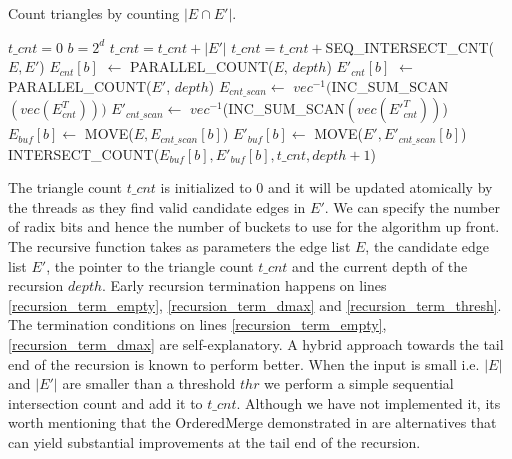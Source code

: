 \documentclass[conference]{IEEEtran}
\begin{document}
\begin{algorithm}
  \caption{Count triangles by counting $|E \cap E'|$.\label{tri_count}}
  \begin{algorithmic}[1]
    \Statex
    \State $t\_cnt = 0$ 
    \State $b=2^d$ 
       \label{recursion_term_empty}
	\State \Return{}
      \EndIf
	\State $t\_cnt = t\_cnt + |E'|$
	\State \Return{}
      \EndIf
	\State $t\_cnt = t\_cnt +$SEQ\_INTERSECT\_CNT($E, E'$)
	\State \Return{}
      \EndIf
      \State $E_{cnt}[b]$ $\gets$ PARALLEL\_COUNT($E$, $depth$) \label{par_cnt_e}
      \State $E'_{cnt}[b]$ $\gets$ PARALLEL\_COUNT($E'$, $depth$) \label{par_cnt_e_prime}
      \State $E_{cnt\_scan} \gets$ $vec^{-1}($INC\_SUM\_SCAN$(vec(E^T_{cnt})))$ \label{inc_sum_scan_e_cnt}
      \State $E'_{cnt\_scan} \gets$ $vec^{-1}$(INC\_SUM\_SCAN$(vec(E'^T_{cnt}))$) \label{inc_sum_scan_e_prime_cnt}
	\State $E_{buf}[b] \gets$ MOVE($E, E_{cnt\_scan}[b]$) \label{move_e_cnt_scan}
      \EndFor
	\State $E'_{buf}[b] \gets$ MOVE($E', E'_{cnt\_scan}[b]$) \label{move_e_prime_cnt_scan}
      \EndFor
	\State INTERSECT\_COUNT($E_{buf}[b], E'_{buf}[b], t\_cnt, depth+1$) \label{recursion_call}
      \EndFor
    \EndFunction
  \end{algorithmic}
\end{algorithm}

The triangle count $t\_cnt$ is initialized to 0 and it will be updated atomically by the threads as they find valid candidate edges in $E'$. We can specify the number of radix bits and hence the number of buckets to use for the algorithm up front. The recursive function takes as parameters the edge list $E$, the candidate edge list $E'$, the pointer to the triangle count $t\_cnt$ and the current depth of the recursion $depth$. Early recursion termination happens on lines \ref{recursion_term_empty}, \ref{recursion_term_dmax} and \ref{recursion_term_thresh}. The termination conditions on lines \ref{recursion_term_empty}, \ref{recursion_term_dmax} are self-explanatory. A hybrid approach towards the tail end of the recursion is known to perform better\cite{b16}. When the input is small i.e. $|E|$ and $|E'|$ are smaller than a threshold $thr$ we perform a simple sequential intersection count and add it to $t\_cnt$. Although we have not implemented it, its worth mentioning that the OrderedMerge demonstrated in \cite{b17, b18} are alternatives that can yield substantial improvements at the tail end of the recursion.
\end{document}
